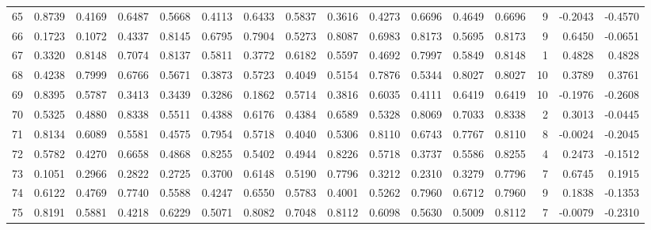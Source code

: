 \begin{tabular}{lrrrrrrrrrrrrrrr}
65  &      0.8739 &  0.4169 &  0.6487 &  0.5668 &  0.4113 &  0.6433 &  0.5837 &  0.3616 &  0.4273 &  0.6696 &   0.4649 &     0.6696 &      9 &                   -0.2043 &                    -0.4570 \\
66  &      0.1723 &  0.1072 &  0.4337 &  0.8145 &  0.6795 &  0.7904 &  0.5273 &  0.8087 &  0.6983 &  0.8173 &   0.5695 &     0.8173 &      9 &                    0.6450 &                    -0.0651 \\
67  &      0.3320 &  0.8148 &  0.7074 &  0.8137 &  0.5811 &  0.3772 &  0.6182 &  0.5597 &  0.4692 &  0.7997 &   0.5849 &     0.8148 &      1 &                    0.4828 &                     0.4828 \\
68  &      0.4238 &  0.7999 &  0.6766 &  0.5671 &  0.3873 &  0.5723 &  0.4049 &  0.5154 &  0.7876 &  0.5344 &   0.8027 &     0.8027 &     10 &                    0.3789 &                     0.3761 \\
69  &      0.8395 &  0.5787 &  0.3413 &  0.3439 &  0.3286 &  0.1862 &  0.5714 &  0.3816 &  0.6035 &  0.4111 &   0.6419 &     0.6419 &     10 &                   -0.1976 &                    -0.2608 \\
70  &      0.5325 &  0.4880 &  0.8338 &  0.5511 &  0.4388 &  0.6176 &  0.4384 &  0.6589 &  0.5328 &  0.8069 &   0.7033 &     0.8338 &      2 &                    0.3013 &                    -0.0445 \\
71  &      0.8134 &  0.6089 &  0.5581 &  0.4575 &  0.7954 &  0.5718 &  0.4040 &  0.5306 &  0.8110 &  0.6743 &   0.7767 &     0.8110 &      8 &                   -0.0024 &                    -0.2045 \\
72  &      0.5782 &  0.4270 &  0.6658 &  0.4868 &  0.8255 &  0.5402 &  0.4944 &  0.8226 &  0.5718 &  0.3737 &   0.5586 &     0.8255 &      4 &                    0.2473 &                    -0.1512 \\
73  &      0.1051 &  0.2966 &  0.2822 &  0.2725 &  0.3700 &  0.6148 &  0.5190 &  0.7796 &  0.3212 &  0.2310 &   0.3279 &     0.7796 &      7 &                    0.6745 &                     0.1915 \\
74  &      0.6122 &  0.4769 &  0.7740 &  0.5588 &  0.4247 &  0.6550 &  0.5783 &  0.4001 &  0.5262 &  0.7960 &   0.6712 &     0.7960 &      9 &                    0.1838 &                    -0.1353 \\
75  &      0.8191 &  0.5881 &  0.4218 &  0.6229 &  0.5071 &  0.8082 &  0.7048 &  0.8112 &  0.6098 &  0.5630 &   0.5009 &     0.8112 &      7 &                   -0.0079 &                    -0.2310 \\

\end{tabular}

